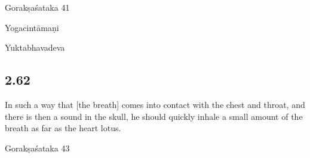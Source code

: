 \begin{ekdosis}
\begin{sources}[hp02_061]
Gorakṣaśataka 41

\begin{versinnote}
\end{versinnote}
\end{sources}

\begin{testimonia}[hp02_061]
Yogacintāmaṇi

\begin{versinnote}
\end{versinnote}

Yuktabhavadeva

\begin{versinnote}
\end{versinnote}
\end{testimonia}

\begin{philcomm}[hp02_061]
\end{philcomm}

\subsection*{2.62}
\begin{translation}[hp02_062]
In such a way that [the breath] comes into contact with the chest and throat, and there is then a sound in the skull, he should quickly inhale a small amount of the breath as far as the heart lotus.
\end{translation}

\begin{sources}[hp02_062]
Gorakṣaśataka 43

\begin{versinnote}
\end{versinnote}
\end{sources}


\end{ekdosis}
